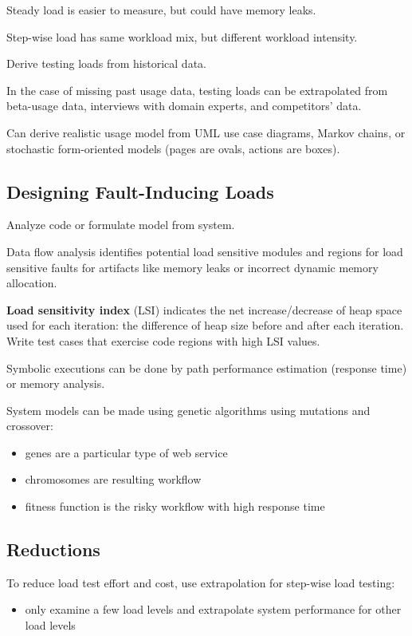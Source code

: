 \documentclass[11pt]{article}
\begin{document}
Steady load is easier to measure, but could have memory leaks.

Step-wise load has same workload mix, but different workload intensity.

Derive testing loads from historical data.

In the case of missing past usage data, testing loads can be extrapolated from beta-usage data,
interviews with domain experts, and competitors' data.

Can derive realistic usage model from UML use case diagrams, Markov chains, or stochastic
form-oriented models (pages are ovals, actions are boxes).
\subsection{Designing Fault-Inducing Loads}
\label{sec:orgbb074d1}
Analyze code or formulate model from system.

Data flow analysis identifies potential load sensitive modules and regions for load sensitive faults
for artifacts like memory leaks or incorrect dynamic memory allocation.

\textbf{Load sensitivity index} (LSI) indicates the net increase/decrease of heap space used for each iteration:
the difference of heap size before and after each iteration.
Write test cases that exercise code regions with high LSI values.

Symbolic executions can be done by path performance estimation (response time) or memory analysis.

System models can be made using genetic algorithms using mutations and crossover:
\begin{itemize}
\item genes are a particular type of web service
\item chromosomes are resulting workflow
\item fitness function is the risky workflow with high response time
\end{itemize}
\subsection{Reductions}
\label{sec:org41cf850}
To reduce load test effort and cost, use extrapolation for step-wise load testing:
\begin{itemize}
\item only examine a few load levels and extrapolate system performance for other load levels
\end{itemize}
\end{document}
